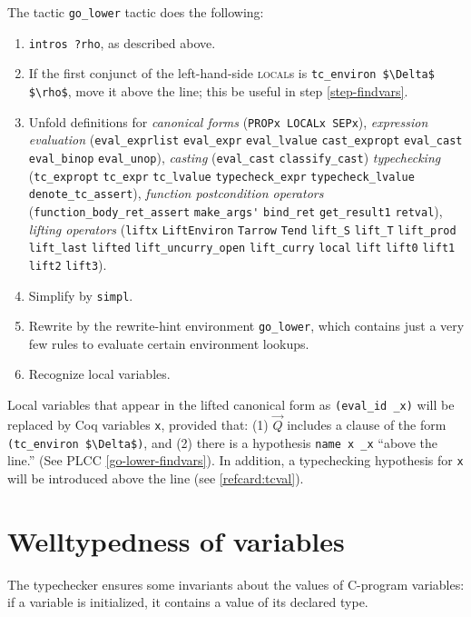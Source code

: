 \documentclass[12pt,fleqn,openany,oneside,showtrims]{memoir}
\newcommand{\ychapter}[2]{\chapter[#1]{#1 \hfill \normalsize #2}}
\begin{document}
The tactic \lstinline{go_lower} tactic
does the following:
\begin{enumerate}
\item \lstinline{intros ?rho}, as described above.
\item If the first conjunct of the
left-hand-side \textsc{local}s is
\lstinline{tc_environ $\Delta$ $\rho$}, move it
above the line; this be useful in step \ref{step-findvars}.
\item Unfold definitions for
\emph{canonical forms}
(\lstinline{PROPx LOCALx SEPx}),
\emph{expression evaluation}
(\lstinline{eval_exprlist}
\lstinline{eval_expr}
\lstinline{eval_lvalue}
\lstinline{cast_expropt}
\lstinline{eval_cast}
\lstinline{eval_binop}
\lstinline{eval_unop}),
\emph{casting} (\lstinline{eval_cast} \lstinline{classify_cast})
\emph{typechecking} (\lstinline{tc_expropt}
\lstinline{tc_expr}
\lstinline{tc_lvalue}
\lstinline{typecheck_expr}
\lstinline{typecheck_lvalue}
\lstinline{denote_tc_assert}),
\emph{function postcondition operators} (\lstinline{function_body_ret_assert}
\lstinline{make_args'}
\lstinline{bind_ret}
\lstinline{get_result1}
\lstinline{retval}),
\emph{lifting operators} (\lstinline{liftx}
\lstinline{LiftEnviron}
\lstinline{Tarrow}
\lstinline{Tend}
\lstinline{lift_S}
\lstinline{lift_T}
\lstinline{lift_prod}
\lstinline{lift_last}
\lstinline{lifted}
\lstinline{lift_uncurry_open}
\lstinline{lift_curry}
\lstinline{local}
\lstinline{lift}
\lstinline{lift0}
\lstinline{lift1}
\lstinline{lift2}
\lstinline{lift3}).
\item Simplify by \lstinline{simpl}.
\item Rewrite by the rewrite-hint environment \lstinline{go_lower}, which contains just a very few rules to evaluate certain environment lookups.
\item Recognize local variables. \label{step-findvars}
\end{enumerate}

Local variables that appear in the lifted canonical form
as \lstinline{(eval_id _x)} will be replaced by
Coq variables \lstinline{x}, provided that:
(1)  $\vec{Q}$ includes a clause of the
form \lstinline{(tc_environ $\Delta$)},
and (2) there is a hypothesis \lstinline{name x _x} ``above the line.''
(See PLCC \autoref{go-lower-findvars}).
In addition, a typechecking hypothesis for \lstinline{x}
will be introduced above the line (see \autoref{refcard:tcval}).

\ychapter{Welltypedness of variables}{}
\label{refcard:tcval}

The typechecker ensures some invariants about the values
of C-program variables: if a variable is initialized, it contains
a value of its declared type.
\end{document}

